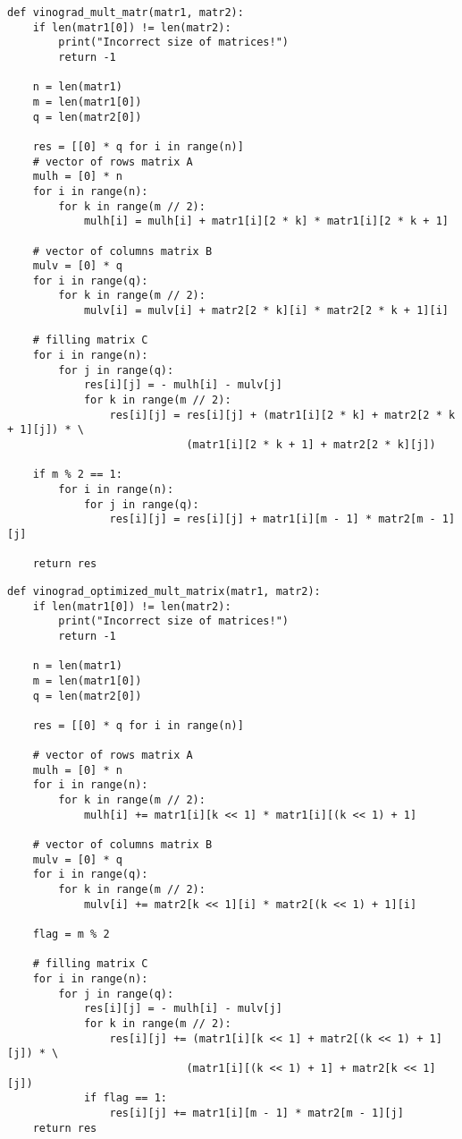 \begin{lstlisting}[caption=Функция алгоритма Винограда умножения матриц,
    label={vinograd_mult}]
def vinograd_mult_matr(matr1, matr2):
    if len(matr1[0]) != len(matr2):
        print("Incorrect size of matrices!")
        return -1

    n = len(matr1)
    m = len(matr1[0])
    q = len(matr2[0])

    res = [[0] * q for i in range(n)]
    # vector of rows matrix A
    mulh = [0] * n
    for i in range(n):
        for k in range(m // 2):
            mulh[i] = mulh[i] + matr1[i][2 * k] * matr1[i][2 * k + 1]

    # vector of columns matrix B
    mulv = [0] * q
    for i in range(q):
        for k in range(m // 2):
            mulv[i] = mulv[i] + matr2[2 * k][i] * matr2[2 * k + 1][i]

    # filling matrix C
    for i in range(n):
        for j in range(q):
            res[i][j] = - mulh[i] - mulv[j]
            for k in range(m // 2):
                res[i][j] = res[i][j] + (matr1[i][2 * k] + matr2[2 * k + 1][j]) * \
                            (matr1[i][2 * k + 1] + matr2[2 * k][j])

    if m % 2 == 1:
        for i in range(n):
            for j in range(q):
                res[i][j] = res[i][j] + matr1[i][m - 1] * matr2[m - 1][j]

    return res
\end{lstlisting}

\begin{lstlisting}[caption=Функция оптимизированного алгоритма Винограда умножения матриц,
	label={vinograd_opt_mult}]
def vinograd_optimized_mult_matrix(matr1, matr2):
    if len(matr1[0]) != len(matr2):
        print("Incorrect size of matrices!")
        return -1

    n = len(matr1)
    m = len(matr1[0])
    q = len(matr2[0])

    res = [[0] * q for i in range(n)]

    # vector of rows matrix A
    mulh = [0] * n
    for i in range(n):
        for k in range(m // 2):
            mulh[i] += matr1[i][k << 1] * matr1[i][(k << 1) + 1]

    # vector of columns matrix B
    mulv = [0] * q
    for i in range(q):
        for k in range(m // 2):
            mulv[i] += matr2[k << 1][i] * matr2[(k << 1) + 1][i]

    flag = m % 2
    
    # filling matrix C
    for i in range(n):
        for j in range(q):
            res[i][j] = - mulh[i] - mulv[j]
            for k in range(m // 2):
                res[i][j] += (matr1[i][k << 1] + matr2[(k << 1) + 1][j]) * \
                            (matr1[i][(k << 1) + 1] + matr2[k << 1][j])
            if flag == 1:
                res[i][j] += matr1[i][m - 1] * matr2[m - 1][j]
    return res

\end{lstlisting}

